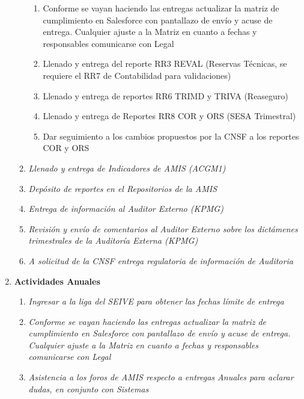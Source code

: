 \documentclass[11pt,twoside,openright,spanish]{report}
\numberwithin{equation}{chapter}
\numberwithin{figure}{chapter}
\numberwithin{table}{chapter}
\begin{document}
\begin{singlespace}
\begin{enumerate}
\begin{enumerate}
\begin{enumerate}
	\item {Conforme se vayan haciendo las entregas actualizar la matriz de cumplimiento en Salesforce con pantallazo de envío y acuse de entrega. Cualquier ajuste a la Matriz en cuanto a fechas y responsables comunicarse con Legal} \\
	\item {Llenado y entrega del reporte RR3 REVAL (Reservas Técnicas, se requiere el RR7 de Contabilidad para validaciones)} \\
	\item {Llenado y entrega de reportes RR6 TRIMD y TRIVA (Reaseguro)} \\
	\item {Llenado y entrega de Reportes RR8 COR y ORS (SESA Trimestral)} \\
	\item {Dar seguimiento a los cambios propuestos por la CNSF a los reportes COR y ORS} \\
		\end{enumerate}
	\item \textit{Llenado y entrega de Indicadores de AMIS (ACGM1)} \\
	\item \textit{Depósito de reportes en el Repositorios de la AMIS} \\
	\item \textit{Entrega de información al Auditor Externo (KPMG)} \\
	\item \textit{Revisión y envío de comentarios al Auditor Externo sobre los dictámenes trimestrales de la Auditoría Externa (KPMG)} \\
	\item \textit{A solicitud de la CNSF entrega regulatoria de información de Auditoria} \\
\end{enumerate}
\item \textbf{Actividades Anuales}
\begin{enumerate}
	\item \textit{Ingresar a la liga del SEIVE para obtener las fechas límite de entrega} \\
	\item \textit{Conforme se vayan haciendo las entregas actualizar la matriz de cumplimiento en Salesforce con pantallazo de envío y acuse de entrega. Cualquier ajuste a la Matriz en cuanto a fechas y responsables comunicarse con Legal} \\
	\item \textit{Asistencia a los foros de AMIS respecto a entregas Anuales para aclarar dudas, en conjunto con Sistemas} \\

\end{enumerate}
\end{enumerate}
\end{singlespace}
\end{document}
